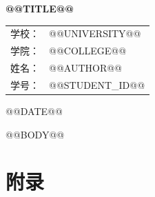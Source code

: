 \documentclass[UTF8,zihao=-4,fontset=none]{ctexart}
\begin{document}
\hypersetup{pageanchor=false}
\begin{titlepage}
  \centering
  {\bfseries @@TITLE@@\par}
  \vspace{2cm}
  \begin{tabular}{rl}
    学校：& @@UNIVERSITY@@\\[0.6em]
    学院：& @@COLLEGE@@\\[0.6em]
    姓名：& @@AUTHOR@@\\[0.6em]
    学号：& @@STUDENT_ID@@\\
  \end{tabular}
  \vfill
  @@DATE@@
\end{titlepage}
\hypersetup{pageanchor=true}

\tableofcontents
\newpage
@@BODY@@

\appendix
\section{附录}
\end{document}
